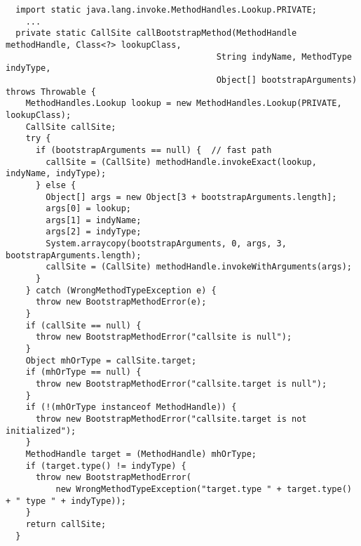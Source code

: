 {\tiny \begin{verbatim}
  import static java.lang.invoke.MethodHandles.Lookup.PRIVATE;
    ...
  private static CallSite callBootstrapMethod(MethodHandle methodHandle, Class<?> lookupClass,
                                          String indyName, MethodType indyType,
                                          Object[] bootstrapArguments) throws Throwable {
    MethodHandles.Lookup lookup = new MethodHandles.Lookup(PRIVATE, lookupClass);
    CallSite callSite;
    try {
      if (bootstrapArguments == null) {  // fast path
        callSite = (CallSite) methodHandle.invokeExact(lookup, indyName, indyType);
      } else {
        Object[] args = new Object[3 + bootstrapArguments.length];
        args[0] = lookup;
        args[1] = indyName;
        args[2] = indyType;
        System.arraycopy(bootstrapArguments, 0, args, 3, bootstrapArguments.length);
        callSite = (CallSite) methodHandle.invokeWithArguments(args);
      }
    } catch (WrongMethodTypeException e) {
      throw new BootstrapMethodError(e);
    }
    if (callSite == null) {
      throw new BootstrapMethodError("callsite is null");
    }
    Object mhOrType = callSite.target;
    if (mhOrType == null) {
      throw new BootstrapMethodError("callsite.target is null");
    }
    if (!(mhOrType instanceof MethodHandle)) {
      throw new BootstrapMethodError("callsite.target is not initialized");
    }
    MethodHandle target = (MethodHandle) mhOrType;
    if (target.type() != indyType) {
      throw new BootstrapMethodError(
          new WrongMethodTypeException("target.type " + target.type() + " type " + indyType));
    }
    return callSite;
  }
\end{verbatim} }